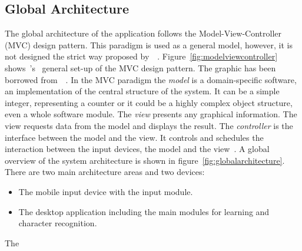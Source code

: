 \subsection{Global Architecture}
\label{sec:globalarchitecture}

The global architecture of the application follows the Model-View-Controller
(MVC) design pattern. This paradigm is used as a general model, however, 
it is not designed the strict way proposed 
by~~\citeyear{Krasner1988}.
Figure~\ref{fig:modelviewcontroller} 
shows~'s~\citeyear{Krasner1988} 
general set-up of the MVC design pattern. The graphic has been borrowed 
from~~\citeyear{Schatten2010}.
In the MVC paradigm the \emph{model} is a domain-specific software, 
an implementation of the central structure of the system. It can be a simple
integer, representing a counter or it could be a highly complex object structure, 
even a whole software module. The \emph{view} presents any graphical information.
The view requests data from the model and displays the result. 
The \emph{controller} is the interface between the model and the view. 
It controls and schedules the interaction between the input devices, 
the model and the view~.
A global overview of the system architecture is shown in 
figure~\ref{fig:globalarchitecture}.
There are two main architecture areas and two devices:
\begin{itemize}
\item The mobile input device with the input module.
\item The desktop application including the main modules for learning
      and character recognition.
\end{itemize}
The

